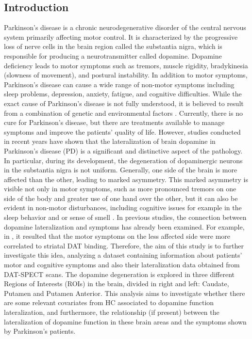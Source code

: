 \documentclass[]{article}
\begin{document}
\begin{multicols}{2}
\section{Introduction}
Parkinson's disease is a chronic neurodegenerative disorder of the central nervous system primarily affecting motor control. It is characterized by the progressive loss of nerve cells in the brain region called the substantia nigra, which is responsible for producing a neurotransmitter called dopamine. Dopamine deficiency leads to motor symptoms such as tremors, muscle rigidity, bradykinesia (slowness of movement), and postural instability. In addition to motor symptoms, Parkinson's disease can cause a wide range of non-motor symptoms including sleep problems, depression, anxiety, fatigue, and cognitive difficulties. While the exact cause of Parkinson's disease is not fully understood, it is believed to result from a combination of genetic and environmental factors \cite{beitz_parkinsons_2014}. Currently, there is no cure for Parkinson's disease, but there are treatments available to manage symptoms and improve the patients’ quality of life.  However, studies conducted in recent years have shown that the lateralization of brain dopamine in Parkinson's disease (PD) is a significant and distinctive aspect of the pathology. In particular, during its development, the degeneration of dopaminergic neurons in the substantia nigra is not uniform. Generally, one side of the brain is more affected than the other, leading to marked asymmetry. This marked asymmetry is visible not only in motor symptoms, such as more pronounced tremors on one side of the body and greater use of one hand over the other, but it can also be evident in non-motor disturbances, including cognitive issues for example in the sleep behavior and or sense of smell \cite{riederer_lateralisation_2018}. 
\newline
In previous studies, the connection between dopamine lateralization and symptoms has already been examined. For example, in \cite{pirker_correlation_2003}, it resulted that the motor symptoms on the less affected side were more correlated to striatal DAT binding.
\newline
Therefore, the aim of this study is to further investigate this idea, analyzing a dataset containing information about patients' motor and cognitive symptoms and also their lateralization data obtained from DAT-SPECT scans. The dopamine degeneration is explored in three different Regions of Interests (ROIs) in the brain, divided in right and left: Caudate, Putamen and Putamen Anterior. This analysis aims to investigate whether there are some relevant covariates from HC associated to dopamine function lateralization, and furthermore, the relationship (if present) between the lateralization of dopamine function in these brain areas and the symptoms shown by Parkinson's patients.

\end{multicols}
\end{document}
